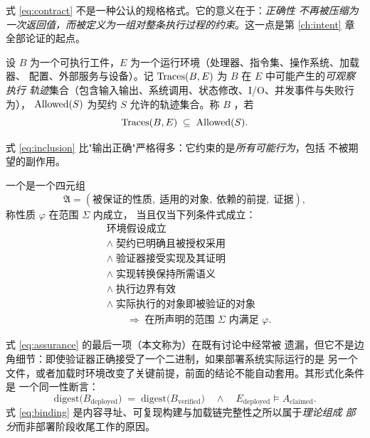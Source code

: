 式 \eqref{eq:contract} 不是一种公认的规格格式。它的意义在于：\emph{正确性
不再被压缩为一次返回值，而被定义为一组对整条执行过程的约束}。这一点是第
\ref{ch:intent} 章全部论证的起点。

\begin{definition}[轨迹与允许集]\label{def:traces}
设 $B$ 为一个可执行工件，$E$ 为一个运行环境（处理器、指令集、操作系统、加载器、
配置、外部服务与设备）。记 $\operatorname{Traces}(B,E)$ 为 $B$ 在 $E$ 中可能产生的\emph{可观察执行
轨迹}集合（包含输入输出、系统调用、状态修改、I/O、并发事件与失败行为），
$\operatorname{Allowed}(S)$ 为契约 $S$ 允许的轨迹集合。称 $B$ ，若
\begin{equation}\label{eq:inclusion}
\operatorname{Traces}(B,E) \;\subseteq\; \operatorname{Allowed}(S).
\end{equation}
\end{definition}

式 \eqref{eq:inclusion} 比"输出正确"严格得多：它约束的是\emph{所有可能行为}，包括
不被期望的副作用。

\begin{definition}[保证与其条件式]\label{def:assurance}
一个是一个四元组
\[
\mathfrak{A} = (\text{被保证的性质},\; \text{适用的对象},\;
\text{依赖的前提},\; \text{证据}),
\]
称性质 $\varphi$ 在范围 $\Sigma$ 内成立，
当且仅当下列条件式成立：
\begin{equation}\label{eq:assurance}
\begin{aligned}
&\text{环境假设成立} \\
&\land\; \text{契约已明确且被授权采用} \\
&\land\; \text{验证器接受实现及其证明} \\
&\land\; \text{实现转换保持所需语义} \\
&\land\; \text{执行边界有效} \\
&\land\; \text{实际执行的对象即被验证的对象} \\
&\qquad\Longrightarrow\; \text{在所声明的范围 } \Sigma \text{ 内满足 } \varphi .
\end{aligned}
\end{equation}
\end{definition}

式 \eqref{eq:assurance} 的最后一项（本文称为）在既有讨论中经常被
遗漏，但它不是边角细节：即使验证器正确接受了一个二进制，如果部署系统实际运行的是
另一个文件，或者加载时环境改变了关键前提，前面的结论不能自动套用。其形式化条件是
一个同一性断言：
\begin{equation}\label{eq:binding}
\mathrm{digest}\bigl(B_{\text{deployed}}\bigr) \;=\;
\mathrm{digest}\bigl(B_{\text{verified}}\bigr)
\quad \land \quad
E_{\text{deployed}} \models A_{\text{claimed}} .
\end{equation}
式 \eqref{eq:binding} 是内容寻址、可复现构建与加载链完整性之所以属于\emph{理论组成
部分}而非部署阶段收尾工作的原因。

